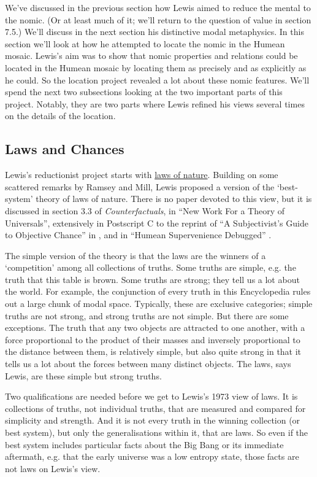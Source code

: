 We've discussed in the previous section how Lewis aimed to reduce the mental to the nomic. (Or at least much of it; we'll return to the question of value in section 7.5.) We'll discuss in the next section his distinctive modal metaphysics. In this section we'll look at how he attempted to locate the nomic in the Humean mosaic. Lewis's aim was to show that nomic properties and relations could be located in the Humean mosaic by locating them as precisely and as explicitly as he could. So the location project revealed a lot about these nomic features. We'll spend the next two subsections looking at the two important parts of this project. Notably, they are two parts where Lewis refined his views several times on the details of the location.

\subsection{Laws and Chances} 
Lewis's reductionist project starts with \href{http://plato.stanford.edu/laws-of-nature/}{laws of nature}. Building on some scattered remarks by Ramsey and Mill, Lewis proposed a version of the `best-system' theory of laws of nature. There is no paper devoted to this view, but it is discussed in section 3.3 of \textit{Counterfactuals}, in ``New Work For a Theory of Universals'', extensively in Postscript C to the reprint of ``A Subjectivist's Guide to Objective Chance'' in \citeyearpar{Lewis1986b}, and in ``Humean Supervenience Debugged'' \citeyearpar{Lewis1994a}.

The simple version of the theory is that the laws are the winners of a `competition' among all collections of truths. Some truths are simple, e.g. the truth that this table is brown. Some truths are strong; they tell us a lot about the world. For example, the conjunction of every truth in this Encyclopedia rules out a large chunk of modal space. Typically, these are exclusive categories; simple truths are not strong, and strong truths are not simple. But there are some exceptions. The truth that any two objects are attracted to one another, with a force proportional to the product of their masses and inversely proportional to the distance between them, is relatively simple, but also quite strong in that it tells us a lot about the forces between many distinct objects. The laws, says Lewis, are these simple but strong truths.

Two qualifications are needed before we get to Lewis's 1973 view of laws. It is collections of truths, not individual truths, that are measured and compared for simplicity and strength. And it is not every truth in the winning collection (or best system), but only the generalisations within it, that are laws. So even if the best system includes particular facts about the Big Bang or its immediate aftermath, e.g. that the early universe was a low entropy state, those facts are not laws on Lewis's view.


